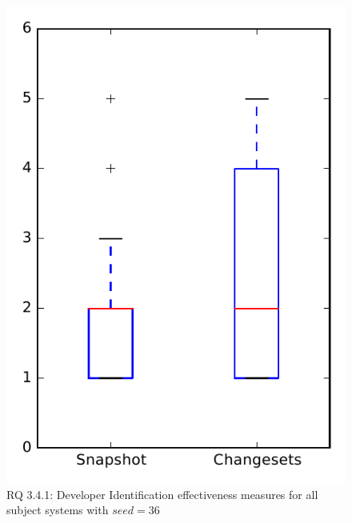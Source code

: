 
\begin{figure}
\centering
\includegraphics[height=0.4\textheight]{figures/dit_seed/rq1_overview_36}
\caption{RQ 3.4.1: Developer Identification effectiveness measures for all subject systems with $seed=36$}
\label{fig:dit_seed:rq1:overview}
\end{figure}
